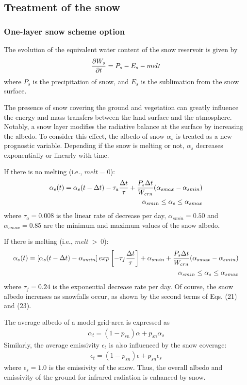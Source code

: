 \subsection{Treatment of the snow}

\subsubsection{One-layer snow scheme option}

The evolution of the equivalent water content of the snow reservoir
is given by
\begin{eqnarray}
{\partial W_s \over \partial t} = P_s - E_s - melt
\end{eqnarray}
where $P_s$ is the precipitation of snow, and $E_s$ is the sublimation
from the snow surface.

The presence of snow covering the ground and
vegetation can greatly influence the energy and mass
transfers between the land surface and the atmosphere.
Notably, a snow layer modifies the radiative
balance at the surface by increasing the albedo.
To consider this effect, the albedo of snow $\alpha_s$ is treated
as a new prognostic variable.
Depending if the snow is melting or not,
$\alpha_s$ decreases
exponentially or linearly with time.

If there is no melting (i.e., $melt=0$):
\begin{eqnarray}
\alpha_s (t) = \alpha_s (t-\Delta t) - \tau_a {\Delta t \over \tau}
+ { P_s \Delta t \over W_{crn} } ( \alpha_{smax} - \alpha_{smin} ) \\
\alpha_{smin} \leq \alpha_s \leq \alpha_{smax}
\end{eqnarray}
where $\tau_a=0.008$ is the linear rate of decrease per day,
$\alpha_{smin}=0.50$
and $\alpha_{smax}=0.85$ are the minimum and maximum values of the snow
albedo.

If there is melting (i.e., $melt \ > \ 0$):
\begin{eqnarray}
\alpha_s (t) = \left[ \alpha_s(t - \Delta t) - \alpha_{smin} \right]
exp \left[ -\tau_f {\Delta t \over \tau } \right]
+ \alpha_{smin}
+ { P_s \Delta t \over W_{crn} } ( \alpha_{smax} - \alpha_{smin} ) \\
\alpha_{smin} \leq \alpha_s \leq \alpha_{smax}
\end{eqnarray}
where $\tau_f=0.24$ is the exponential decrease rate per day.
Of course, the snow albedo increases as snowfalls occur, as shown
by the second terms of Eqs. (21) and (23).

The average albedo of a model grid-area is expressed as
\begin{eqnarray}
\alpha_t = (1-p_{sn}) \alpha + p_{sn} \alpha_s
\end{eqnarray}
Similarly, the average emissivity $\epsilon_t$ is also
influenced by the snow coverage:
\begin{eqnarray}
\epsilon_t = (1-p_{sn}) \epsilon + p_{sn} \epsilon_s
\end{eqnarray}
where $\epsilon_s = 1.0$ is the emissivity of the snow.
Thus, the overall albedo and emissivity of the ground for infrared radiation
is enhanced by snow.

